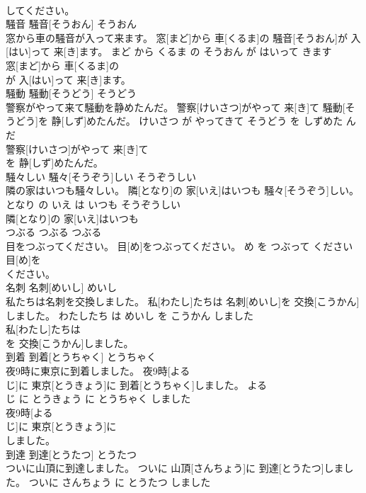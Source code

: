 \documentclass[8pt]{extreport}
\begin{document}
\begin{CJK}{UTF8}{min}
\\	してください。			
\\	騒音	騒音[そうおん]	そうおん	
\\	窓から車の騒音が入って来ます。	窓[まど]から 車[くるま]の 騒音[そうおん]が 入[はい]って 来[き]ます。	まど から くるま の そうおん が はいって きます	
\\	窓[まど]から 車[くるま]の
\\	が 入[はい]って 来[き]ます。			
\\	騒動	騒動[そうどう]	そうどう	
\\	警察がやって来て騒動を静めたんだ。	警察[けいさつ]がやって 来[き]て 騒動[そうどう]を 静[しず]めたんだ。	けいさつ が やってきて そうどう を しずめた ん だ	
\\	警察[けいさつ]がやって 来[き]て
\\	を 静[しず]めたんだ。			
\\	騒々しい	騒々[そうぞう]しい	そうぞうしい	
\\	隣の家はいつも騒々しい。	隣[となり]の 家[いえ]はいつも 騒々[そうぞう]しい。	となり の いえ は いつも そうぞうしい	
\\	隣[となり]の 家[いえ]はいつも
\\	つぶる	つぶる	つぶる	
\\	目をつぶってください。	目[め]をつぶってください。	め を つぶって ください	
\\	目[め]を
\\	ください。			
\\	名刺	名刺[めいし]	めいし	
\\	私たちは名刺を交換しました。	私[わたし]たちは 名刺[めいし]を 交換[こうかん]しました。	わたしたち は めいし を こうかん しました	
\\	私[わたし]たちは
\\	を 交換[こうかん]しました。			
\\	到着	到着[とうちゃく]	とうちゃく	
\\	夜9時に東京に到着しました。	夜9時[よる 
\\	じ]に 東京[とうきょう]に 到着[とうちゃく]しました。	よる 
\\	じ に とうきょう に とうちゃく しました	
\\	夜9時[よる 
\\	じ]に 東京[とうきょう]に
\\	しました。			
\\	到達	到達[とうたつ]	とうたつ	
\\	ついに山頂に到達しました。	ついに 山頂[さんちょう]に 到達[とうたつ]しました。	ついに さんちょう に とうたつ しました	

\end{CJK}
\end{document}
